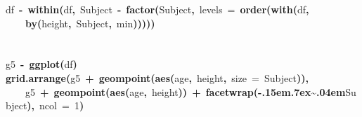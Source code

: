 \documentclass{article}
\makeatletter
\newcommand{\hlnumber}[1]{\textcolor[rgb]{0,0,0}{#1}}%
\newcommand{\hlfunctioncall}[1]{\textcolor[rgb]{.5,0,.33}{\textbf{#1}}}%
\newcommand{\hlkeyword}[1]{\textbf{#1}}%
\newcommand{\hlargument}[1]{\textcolor[rgb]{.69,.25,.02}{#1}}%
\newcommand{\hlassignement}[1]{\textbf{#1}}%
\newcommand{\hlsymbol}[1]{#1}%
\def\urltilda{\kern -.15em\lower .7ex\hbox{\~{}}\kern .04em}%
\newcommand{\hlstd}[1]{\textcolor[rgb]{0,0,0}{#1}}%
\newenvironment{kframe}{%
 \def\FrameCommand##1{\hskip\@totalleftmargin \hskip-\fboxsep
 \colorbox{shadecolor}{##1}\hskip-\fboxsep
     \hskip-\linewidth \hskip-\@totalleftmargin \hskip\columnwidth}%
 \MakeFramed {\advance\hsize-\width
   \@totalleftmargin\z@ \linewidth\hsize
   \@setminipage}}%
 {\par\unskip\endMakeFramed}
\newenvironment{knitrout}{}{} %
\makeatother
\begin{document}
\begin{knitrout}
{\begin{kframe}
\begin{flushleft}
\hlstd{}\hlsymbol{df}{\ }\hlassignement{\usebox{\hlnormalsizeboxlessthan}-}{\ }\hlfunctioncall{within}\hlkeyword{(}\hlsymbol{df}\hlkeyword{,}{\ }\hlsymbol{Subject}{\ }\hlassignement{\usebox{\hlnormalsizeboxlessthan}-}{\ }\hlfunctioncall{factor}\hlkeyword{(}\hlsymbol{Subject}\hlkeyword{,}{\ }\hlargument{levels}{\ }\hlargument{=}{\ }\hlfunctioncall{order}\hlkeyword{(}\hlfunctioncall{with}\hlkeyword{(}\hlsymbol{df}\hlkeyword{,}\hspace*{\fill}\\
\hlstd{}{\ }{\ }{\ }{\ }\hlfunctioncall{by}\hlkeyword{(}\hlsymbol{height}\hlkeyword{,}{\ }\hlsymbol{Subject}\hlkeyword{,}{\ }\hlsymbol{min}\hlkeyword{)}\hlkeyword{)}\hlkeyword{)}\hlkeyword{)}\hlkeyword{)}\hspace*{\fill}\\
\hlstd{}\hspace*{\fill}\\
\hlstd{}\hspace*{\fill}\\
\hlstd{}\hlsymbol{g5}{\ }\hlassignement{\usebox{\hlnormalsizeboxlessthan}-}{\ }\hlfunctioncall{ggplot}\hlkeyword{(}\hlsymbol{df}\hlkeyword{)}\hspace*{\fill}\\
\hlstd{}\hlfunctioncall{grid.arrange}\hlkeyword{(}\hlsymbol{g5}{\ }\hlkeyword{+}{\ }\hlfunctioncall{geom\usebox{\hlnormalsizeboxunderscore}point}\hlkeyword{(}\hlfunctioncall{aes}\hlkeyword{(}\hlsymbol{age}\hlkeyword{,}{\ }\hlsymbol{height}\hlkeyword{,}{\ }\hlargument{size}{\ }\hlargument{=}{\ }\hlsymbol{Subject}\hlkeyword{)}\hlkeyword{)}\hlkeyword{,}\hspace*{\fill}\\
\hlstd{}{\ }{\ }{\ }{\ }\hlsymbol{g5}{\ }\hlkeyword{+}{\ }\hlfunctioncall{geom\usebox{\hlnormalsizeboxunderscore}point}\hlkeyword{(}\hlfunctioncall{aes}\hlkeyword{(}\hlsymbol{age}\hlkeyword{,}{\ }\hlsymbol{height}\hlkeyword{)}\hlkeyword{)}{\ }\hlkeyword{+}{\ }\hlfunctioncall{facet\usebox{\hlnormalsizeboxunderscore}wrap}\hlkeyword{(}\hlkeyword{\urltilda{}}\hlsymbol{Subject}\hlkeyword{)}\hlkeyword{,}{\ }\hlargument{ncol}{\ }\hlargument{=}{\ }\hlnumber{1}\hlkeyword{)}\mbox{}
\normalfont
\end{flushleft}

\end{kframe}}
\end{knitrout}
\end{document}
